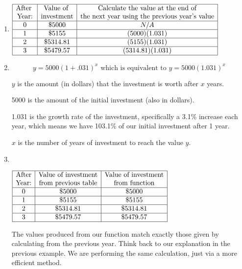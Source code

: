 \documentclass{ximera}
\begin{document}
\begin{explanation}
\begin{enumerate}
\item    $\begin{array}{|c|c|c|}
\hline
\text{After }& \text{Value of } & \text{Calculate the value at the end of} \\
\text{Year:} & \text{investment} & \text{the next year using the previous year's value} \\
\hline
0 & \$5000 & N/A  \\
\hline
1 & \$5155 & (5000)(1.031) \\
\hline
2 &	\$5314.81 & (5155)(1.031) \\
\hline
3 &	\$5479.57 & (5314.81)(1.031)   \\
\hline
\end{array}$

        \item 
		\begin{equation*}
     			y = 5000(1+.031)^x \text{ which is equivalent to }y = 5000(1.031)^x
     		 \end{equation*}
		 
		$y$ is the amount (in dollars) that the investment is worth after $x$ years.
		
		5000 is the amount of the initial investment (also in dollars).
		
		1.031 is the growth rate of the investment, specifically a 3.1\% increase each year, which means we have 103.1\% of our initial investment after 1 year.
		
		$x$ is the number of years of investment to reach the value $y$.

       \item~\begin{center}$\begin{array}{|c|c|c|}
\hline
\text{After}& \text{Value of investment} & \text{Value of investment} \\
\text{Year:}& \text{from previous table} & \text{from function} \\
\hline
0 & \$5000 & \$5000\\
\hline
1 & \$5155 &  \$5155\\
\hline
2 &	\$5314.81 & \$5314.81 \\
\hline
3 &	\$5479.57 & \$5479.57 \\
\hline
\end{array}$\end{center}
\smallskip
The values produced from our function match exactly those given by calculating from the previous year. Think back to our explanation in the previous example. We are performing the same calculation, just via a more efficient method.


\end{enumerate}
\end{explanation}
\end{document}
